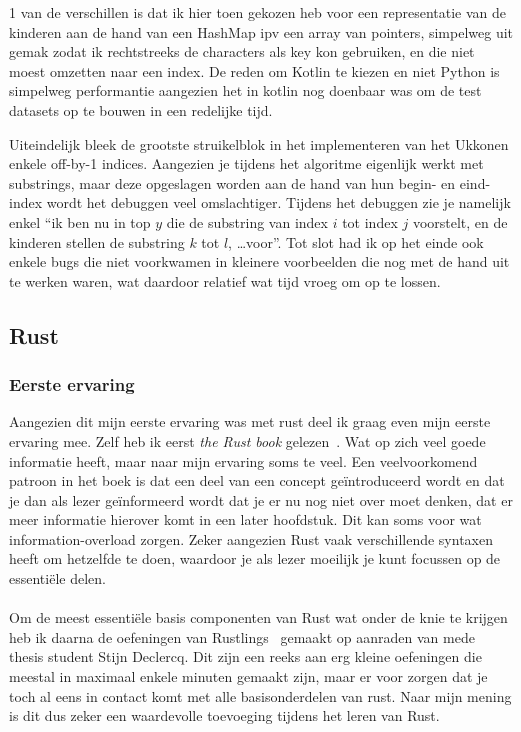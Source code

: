 1 van de verschillen is dat ik hier toen gekozen heb voor een representatie van de kinderen aan de hand van een HashMap ipv een array van pointers, simpelweg uit gemak zodat ik rechtstreeks de characters als key kon gebruiken, en die niet moest omzetten naar een index.
De reden om Kotlin te kiezen en niet Python is simpelweg performantie aangezien het in kotlin nog doenbaar was om de test datasets op te bouwen in een redelijke tijd.

Uiteindelijk bleek de grootste struikelblok in het implementeren van het Ukkonen enkele off-by-1 indices.
Aangezien je tijdens het algoritme eigenlijk werkt met substrings, maar deze opgeslagen worden aan de hand van hun begin- en eind-index wordt het debuggen veel omslachtiger.
Tijdens het debuggen zie je namelijk enkel ``ik ben nu in top $y$ die de substring van index $i$ tot index $j$ voorstelt, en de kinderen stellen de substring $k$ tot $l$, \ldots voor''.
Tot slot had ik op het einde ook enkele bugs die niet voorkwamen in kleinere voorbeelden die nog met de hand uit te werken waren, wat daardoor relatief wat tijd vroeg om op te lossen.

\subsection{Rust}\label{subsec:rust}
\subsubsection{Eerste ervaring}
Aangezien dit mijn eerste ervaring was met rust deel ik graag even mijn eerste ervaring mee.
Zelf heb ik eerst \textit{the Rust book} gelezen~\cite{the_rust_book}.
Wat op zich veel goede informatie heeft, maar naar mijn ervaring soms te veel.
Een veelvoorkomend patroon in het boek is dat een deel van een concept geïntroduceerd wordt en dat je dan als lezer geïnformeerd wordt dat je er nu nog niet over moet denken, dat er meer informatie hierover komt in een later hoofdstuk.
Dit kan soms voor wat information-overload zorgen.
Zeker aangezien Rust vaak verschillende syntaxen heeft om hetzelfde te doen, waardoor je als lezer moeilijk je kunt focussen op de essentiële delen.
\\ \\
Om de meest essentiële basis componenten van Rust wat onder de knie te krijgen heb ik daarna de oefeningen van Rustlings~\cite{rustlings} gemaakt op aanraden van mede thesis student Stijn Declercq.
Dit zijn een reeks aan erg kleine oefeningen die meestal in maximaal enkele minuten gemaakt zijn, maar er voor zorgen dat je toch al eens in contact komt met alle basisonderdelen van rust.
Naar mijn mening is dit dus zeker een waardevolle toevoeging tijdens het leren van Rust.

